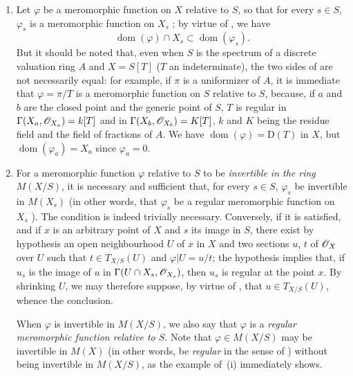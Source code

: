 \begin{remarks}[20.6.5]\label{IV.20.6.5}
\begin{enumerate}[label=(\roman*)]
  \item Let $\varphi$ be a meromorphic function on $X$ relative to $S$, so that for every $s\in S$, $\varphi_s$ is a meromorphic function on $X_s$ ; by virtue of , we have
  \[
  \label{IV.20.6.5.1}
    \operatorname{dom}(\varphi)\cap X_s\subset\operatorname{dom}(\varphi_s).
    \tag{20.6.5.1}
  \]
  But it should be noted that, even when $S$ is the spectrum of a discrete valuation ring $A$ and $X=S[T]$ ($T$ an indeterminate), the two sides of  are not necessarily equal: for example, if $\pi$ is a uniformizer of $A$, it is immediate that $\varphi=\pi/T$ is a meromorphic function on $S$ relative to $S$, because, if $a$ and $b$ are the closed point and the generic point of $S$, $T$ is regular in $\Gamma(X_a,\mathscr{O}_{X_a})=k[T]$ and in $\Gamma(X_b,\mathscr{O}_{X_b})=K[T]$, $k$ and $K$ being the residue field and the field of fractions of $A$.
  We have $\operatorname{dom}(\varphi)=\mathrm{D}(T)$ in $X$, but $\operatorname{dom}(\varphi_a)=X_a$ since $\varphi_a=0$.

  \item For a meromorphic function $\varphi$ relative to $S$ to be \emph{invertible in the ring} $M(X/S)$, it is necessary and sufficient that, for every $s\in S$, $\varphi_s$ be invertible in $M(X_s)$ (in other words, that $\varphi_s$ be a regular meromorphic function on $X_s$ ).
  The condition is
  indeed trivially necessary.
  Conversely, if it is satisfied, and if $x$ is an arbitrary point of $X$ and $s$ its image in $S$, there exist by hypothesis an open neighbourhood $U$ of $x$ in $X$ and two sections $u$, $t$ of $\mathscr{O}_X$ over $U$ such that $t\in T_{X/S}(U)$ and $\varphi|U=u/t$; the hypothesis implies that, if $u_s$ is the image of $u$ in $\Gamma(U\cap X_s,\mathscr{O}_{X_s})$, then $u_s$ is regular at the point $x$.
  By shrinking $U$, we may therefore suppose, by virtue of , that $u\in T_{X/S}(U)$, whence the conclusion.

  When $\varphi$ is invertible in $M(X/S)$, we also say that $\varphi$ is a \emph{regular meromorphic function relative to $S$}.
  Note that $\varphi\in M(X/S)$ may be invertible in $M(X)$ (in other words, be \emph{regular} in the sense of ) without being invertible in $M(X/S)$, as the example of~(i) immediately shows.


\end{enumerate}
\end{remarks}
